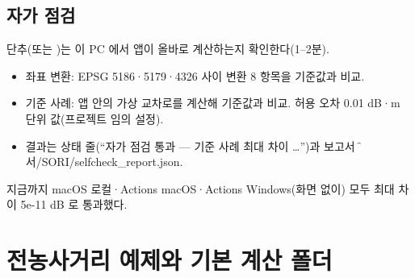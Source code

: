 \documentclass[10.5pt,a4paper]{article}
\begin{document}
\subsection{자가 점검}
 단추(또는 \menu{})는 이 PC 에서 앱이 올바로 계산하는지 확인한다(1–2분).
\begin{itemize}
\item 좌표 변환: EPSG 5186·5179·4326 사이 변환 8 항목을 기준값과 비교.
\item 기준 사례: 앱 안의 가상 교차로를 계산해 기준값과 비교. 허용 오차 0.01 dB·m 단위 값(프로젝트 임의 설정).
\item 결과는 상태 줄(``자가 점검 통과 — 기준 사례 최대 차이 …'')과 보고서 \f{문서/SORI/selfcheck\_report.json}.
\end{itemize}
지금까지 macOS 로컬·Actions macOS·Actions Windows(화면 없이) 모두 최대 차이 5e-11 dB 로 통과했다.

\section{전농사거리 예제와 기본 계산 폴더}\label{sec:jn}
\end{document}
